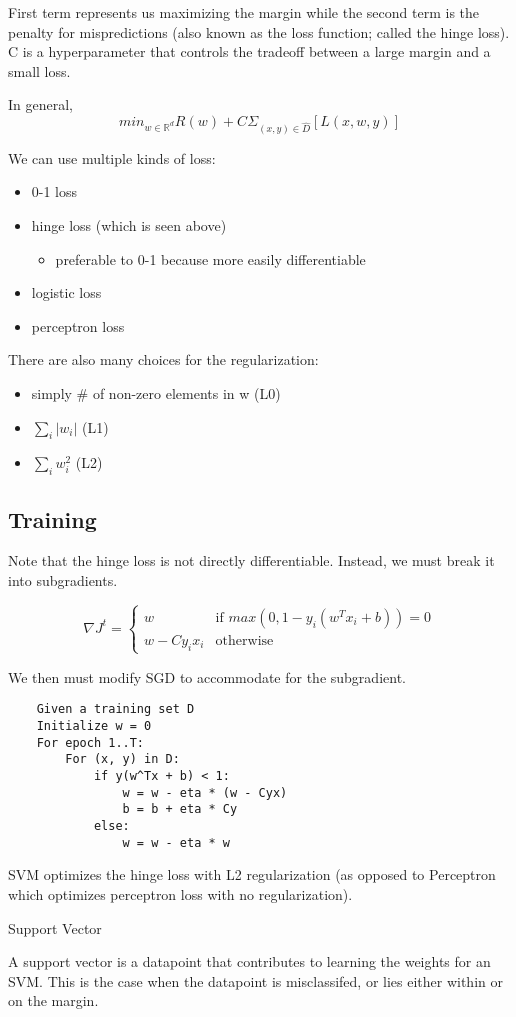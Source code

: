 First term represents us maximizing the margin while the second term is the penalty for mispredictions (also known as the loss function; called the hinge loss). C is a hyperparameter that controls the tradeoff between a large margin and a small loss. 

In general,
\[
  min_{w\in \mathbb{R}^d} R(w) + C \Sigma_{(x, y) \in \hat{D}} [L(x,w,y)]
\]

We can use multiple kinds of loss:
\begin{itemize}
    \item 0-1 loss 
    \item hinge loss (which is seen above)
    \begin{itemize}
        \item preferable to 0-1 because more easily differentiable
    \end{itemize}
    \item logistic loss
    \item perceptron loss
\end{itemize}

There are also many choices for the regularization:
\begin{itemize}
    \item simply \# of non-zero elements in w (L0)
    \item $\sum_i |w_i|$ (L1)
    \item $\sum_i w_i^2$ (L2)
\end{itemize}

\subsection*{Training}
Note that the hinge loss is not directly differentiable. Instead, we must break it into subgradients.

\begin{equation*}
    \nabla J^t = \begin{cases}
        w & \text{if } max(0, 1-y_i(w^Tx_i+b)) = 0 \\
        w - Cy_ix_i & \text{otherwise}
    \end{cases}
\end{equation*}

We then must modify SGD to accommodate for the subgradient.

\begin{verbatim}
    Given a training set D
    Initialize w = 0
    For epoch 1..T:
        For (x, y) in D:
            if y(w^Tx + b) < 1:
                w = w - eta * (w - Cyx)
                b = b + eta * Cy
            else:
                w = w - eta * w
\end{verbatim}

SVM optimizes the hinge loss with L2 regularization (as opposed to Perceptron which optimizes perceptron loss with no regularization).

\begin{definition}
    Support Vector

    A support vector is a datapoint that contributes to learning the weights for an SVM. This is the case when the datapoint is misclassifed, or lies either within or on the margin.
\end{definition}